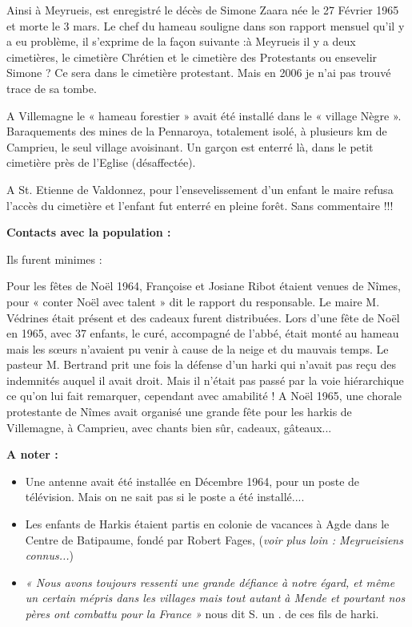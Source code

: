 Ainsi à Meyrueis, est enregistré le décès de Simone Zaara née le 27 Février 1965 et
morte le 3 mars. Le chef du hameau souligne dans son rapport mensuel qu’il y a eu
problème, il s’exprime de la façon suivante :à Meyrueis il y a deux cimetières, le
cimetière Chrétien et le cimetière des Protestants ou ensevelir Simone ?
Ce sera dans le cimetière protestant. Mais en 2006 je n’ai pas trouvé trace de sa
tombe.

A Villemagne le « hameau forestier » avait été installé dans le « village
Nègre ». Baraquements des mines de la Pennaroya, totalement isolé, à plusieurs km de
Camprieu, le seul village avoisinant. Un garçon est enterré là, dans le petit cimetière
près de l’Eglise (désaffectée).

A St. Etienne de Valdonnez, pour l’ensevelissement d’un enfant le maire refusa
l’accès du cimetière et l’enfant fut enterré en pleine forêt.
Sans commentaire !!!

\textbf{Contacts avec la population :}

Ils furent minimes :

Pour les fêtes de Noël 1964, Françoise et Josiane Ribot étaient venues de Nîmes, pour
« conter Noël avec talent » dit le rapport du responsable. Le maire M. Védrines était
présent et des cadeaux furent distribuées.
Lors d’une fête de Noël en 1965, avec 37 enfants, le curé, accompagné de l’abbé,
était monté au hameau mais les sœurs n’avaient pu venir à cause de la neige et du
mauvais temps.
Le pasteur M. Bertrand prit une fois la défense d’un harki qui n’avait pas reçu des
indemnités auquel il avait droit. Mais il n’était pas passé par la voie hiérarchique ce
qu’on lui fait remarquer, cependant avec amabilité !
A Noël 1965, une chorale protestante de Nîmes avait organisé une grande fête pour
les harkis de Villemagne, à Camprieu, avec chants bien sûr, cadeaux, gâteaux...

\textbf{A noter :}

\begin{itemize}
    \item Une antenne avait été installée en Décembre 1964, pour un poste de télévision.
    Mais on ne sait pas si le poste a été installé....
    
    \item Les enfants de Harkis étaient partis en colonie de vacances à Agde dans le
    Centre de Batipaume, fondé par Robert Fages, (\textit{voir plus loin : Meyrueisiens
    connus...})
    
    \item \textit{« Nous avons toujours ressenti une grande défiance à notre égard, et même un certain mépris
    dans les villages mais tout autant à Mende et pourtant nos pères ont combattu pour la
    France »} nous dit S. un . de ces fils de harki.
\end{itemize}

